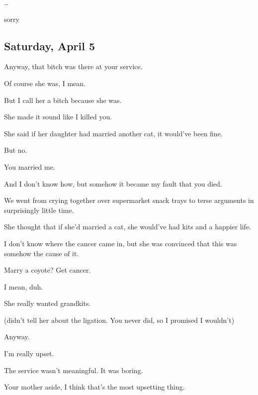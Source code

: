 {
\ldots{}

 sorry

\newpage

\subsection*{Saturday, April 5}\label{saturday-april-5}

 Anyway, that bitch was there at your service.

 Of course she was, I mean.

 But I call her a bitch because she was.

 She made it sound like I killed you.

 She said if her daughter had married another cat, it would've been fine.

 But no.

 You married me.

 And I don't know how, but somehow it became my fault that you died.

 We went from crying together over supermarket snack trays to terse arguments in surprisingly little time.

 She thought that if she'd married a cat, she would've had kits and a happier life.

 I don't know where the cancer came in, but she was convinced that this was somehow the cause of it.

 Marry a coyote? Get cancer.

 I mean, duh.

 She really wanted grandkits.

(didn't tell her about the ligation. You never did, so I promised I wouldn't)

 Anyway.

 I'm really upset.

 The service wasn't meaningful. It was boring.

 Your mother aside, I think that's the most upsetting thing.

}
